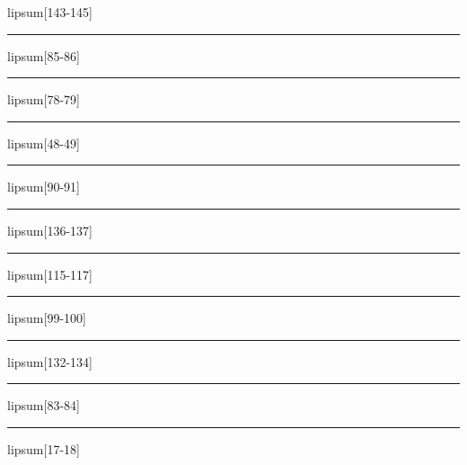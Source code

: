 \documentclass[11pt,a4paper]{article}
\begin{document}
lipsum[143-145]

\begin{simplewrap}
  \textcolor{teal!18}{\rule{3.5cm}{8.8cm}}
\end{simplewrap}
lipsum[85-86]

\begin{simplewrap}
  \textcolor{purple!12}{\rule{3.5cm}{4.6cm}}
\end{simplewrap}
lipsum[78-79]

\begin{simplewrap}
  \textcolor{magenta!32}{\rule{3.2cm}{7.7cm}}
\end{simplewrap}
lipsum[48-49]

\begin{simplewrap}
  \textcolor{cyan!20}{\rule{4.2cm}{6.3cm}}
\end{simplewrap}
lipsum[90-91]

\begin{simplewrap}
  \textcolor{yellow!52}{\rule{4.0cm}{4.9cm}}
\end{simplewrap}
lipsum[136-137]

\begin{simplewrap}
  \textcolor{magenta!58}{\rule{5.9cm}{2.1cm}}
\end{simplewrap}
lipsum[115-117]

\begin{simplewrap}
  \textcolor{magenta!12}{\rule{5.0cm}{4.6cm}}
\end{simplewrap}
lipsum[99-100]

\begin{simplewrap}
  \textcolor{violet!11}{\rule{5.7cm}{8.6cm}}
\end{simplewrap}
lipsum[132-134]

\begin{simplewrap}
  \textcolor{blue!41}{\rule{3.1cm}{9.2cm}}
\end{simplewrap}
lipsum[83-84]

\begin{simplewrap}
  \textcolor{orange!20}{\rule{5.9cm}{8.2cm}}
\end{simplewrap}
lipsum[17-18]
\end{document}
